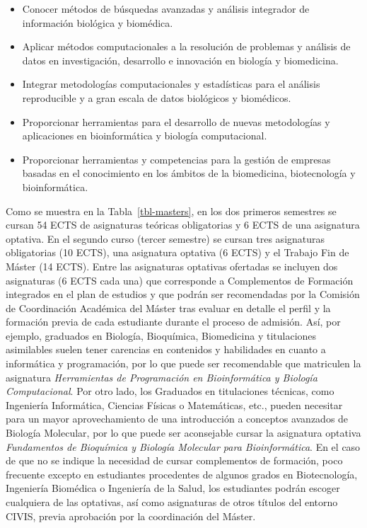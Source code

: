 \documentclass[
  11pt,
  a4paper,
  twoside]{scrreprt}
\providecommand{\tightlist}{%
  \setlength{\itemsep}{0pt}\setlength{\parskip}{0pt}}
\begin{document}
\begin{itemize}
\tightlist
\item
  Conocer métodos de búsquedas avanzadas y análisis integrador de
  información biológica y biomédica.
\item
  Aplicar métodos computacionales a la resolución de problemas y
  análisis de datos en investigación, desarrollo e innovación en
  biología y biomedicina.
\item
  Integrar metodologías computacionales y estadísticas para el análisis
  reproducible y a gran escala de datos biológicos y biomédicos.
\item
  Proporcionar herramientas para el desarrollo de nuevas metodologías y
  aplicaciones en bioinformática y biología computacional.
\item
  Proporcionar herramientas y competencias para la gestión de empresas
  basadas en el conocimiento en los ámbitos de la biomedicina,
  biotecnología y bioinformática.
\end{itemize}

Como se muestra en la Tabla~\ref{tbl-masters}, en los dos primeros
semestres se cursan 54 ECTS de asignaturas teóricas obligatorias y 6
ECTS de una asignatura optativa. En el segundo curso (tercer semestre)
se cursan tres asignaturas obligatorias (10 ECTS), una asignatura
optativa (6 ECTS) y el Trabajo Fin de Máster (14 ECTS). Entre las
asignaturas optativas ofertadas se incluyen dos asignaturas (6 ECTS cada
una) que corresponde a Complementos de Formación integrados en el plan
de estudios y que podrán ser recomendadas por la Comisión de
Coordinación Académica del Máster tras evaluar en detalle el perfil y la
formación previa de cada estudiante durante el proceso de admisión. Así,
por ejemplo, graduados en Biología, Bioquímica, Biomedicina y
titulaciones asimilables suelen tener carencias en contenidos y
habilidades en cuanto a informática y programación, por lo que puede ser
recomendable que matriculen la asignatura \emph{Herramientas de
Programación en Bioinformática y Biología Computacional}. Por otro lado,
los Graduados en titulaciones técnicas, como Ingeniería Informática,
Ciencias Físicas o Matemáticas, etc., pueden necesitar para un mayor
aprovechamiento de una introducción a conceptos avanzados de Biología
Molecular, por lo que puede ser aconsejable cursar la asignatura
optativa \emph{Fundamentos de Bioquímica y Biología Molecular para
Bioinformática}. En el caso de que no se indique la necesidad de cursar
complementos de formación, poco frecuente excepto en estudiantes
procedentes de algunos grados en Biotecnología, Ingeniería Biomédica o
Ingeniería de la Salud, los estudiantes podrán escoger cualquiera de las
optativas, así como asignaturas de otros títulos del entorno CIVIS,
previa aprobación por la coordinación del Máster.
\end{document}
